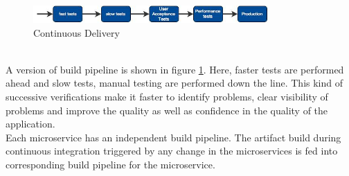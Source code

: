\begin{enumerate}
\\
\begin{figure}[H]
\begin{center}
\includegraphics[width=0.8\textwidth]{figures/challenges_six_continuous_delivery}
\caption{Continuous Delivery \cite{Newman:2015aa}}
\label{fig:challanges_of_microservices_architecture/deployment/continuous_delivery}
\end{center}
\end{figure}
\\
A version of build pipeline is shown in figure \ref{fig:challanges_of_microservices_architecture/deployment/continuous_delivery}. Here, faster tests are performed ahead and slow tests, manual testing are performed down the line. This kind of successive verifications make it faster to identify problems, clear visibility of problems and improve the quality as well as confidence in the quality of the application.\\
Each microservice has an independent build pipeline. The artifact build during continuous integration triggered by any change in the microservices is fed into corresponding build pipeline for the microservice. \cite{Newman:2015aa} \cite{Fowler:2013aa}
\end{enumerate}













